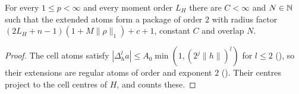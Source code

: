 \begin{lemma}
\label{lem:extension-atoms-two}
\leanok
{}
For every $1 \leq p < \infty$ and every moment order $L_H$ there are $C < \infty$ and $N \in \mathbb{N}$
such that the extended atoms form a package of order $2$ with radius factor
$(2 L_H + n - 1)(1 + M \|\rho\|_1) + c + 1$, constant $C$ and overlap $N$.
\end{lemma}

\begin{proof}
\leanok
The cell atoms satisfy $|\Delta_h^l a| \leq A_0 \min(1, (2^j \|h\|)^l)$ for $l \leq 2$
(), so their extensions are regular atoms of order and exponent $2$
(). Their centres project to the cell centres of $H$, and
 counts these.
\end{proof}

